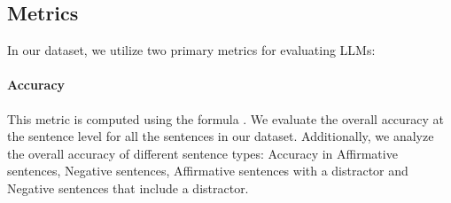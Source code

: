 \documentclass[11pt]{article}
\begin{document}
\subsection{Metrics}

In our dataset, we utilize two primary metrics for evaluating LLMs:

\paragraph{Accuracy} This metric is computed using the formula . We evaluate the overall accuracy at the sentence level for all the sentences in our dataset. Additionally, we analyze the overall accuracy of different sentence types: Accuracy in Affirmative sentences, Negative sentences, Affirmative sentences with a distractor and Negative sentences that include a distractor.



\end{document}
